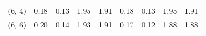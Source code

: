 \begin{tabular}{lrrrrrrrr}
(6, 4)        &                                               0.18 &                                            0.13 &                            1.95 &                                  1.91 &                                               0.18 &                                            0.13 &                            1.95 &                                  1.91 \\
(6, 6)        &                                               0.20 &                                            0.14 &                            1.93 &                                  1.91 &                                               0.17 &                                            0.12 &                            1.88 &                                  1.88 \\
\bottomrule
\end{tabular}
